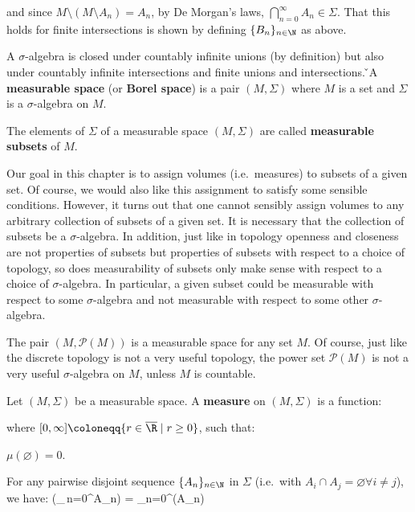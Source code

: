 and since $M\setminus(M\setminus A_n)=A_n$, by De Morgan's laws, $\bigcap_{n=0}^{\infty}{A_n} \in \Sigma$. That this
holds for finite intersections is shown by defining $\{B_n\}_{n\in \N}$ as above. \qedhere
\een
\eq

A $\sigma$-algebra is closed under countably infinite unions (by definition) but also under countably infinite
intersections and finite unions and intersections. \v

A \textbf{measurable space} (or \textbf{Borel space}) is a pair $(M,\Sigma)$ where $M$ is a set and $\Sigma$ is a
$\sigma$-algebra on $M$.
\ed

The elements of $\Sigma$ of a measurable space $(M,\Sigma)$ are called \textbf{measurable subsets} of $M$.
\ed

Our goal in this chapter is to assign volumes (i.e.\ measures) to subsets of a given set. Of course, we would also
like this assignment to satisfy some sensible conditions. However, it turns out that one cannot sensibly assign
volumes to any arbitrary collection of subsets of a given set. It is necessary that the collection of subsets be a
$\sigma$-algebra. In addition, just like in topology openness and closeness are not properties of subsets but
properties of subsets with respect to a choice of topology, so does measurability of subsets only make sense with
respect to a choice of $\sigma$-algebra. In particular, a given subset could be measurable with respect to some
$\sigma$-algebra and not measurable with respect to some other $\sigma$-algebra.

\be
The pair $(M,\mathscr{P}(M))$ is a measurable space for any set $M$. Of course, just like the discrete topology is
not a very useful topology, the power set $\mathscr{P}(M)$ is not a very useful $\sigma$-algebra on $M$, unless $M$
is countable.
\ee

\bd [Measure]
Let $(M,\Sigma)$ be a measurable space. A \textbf{measure} on $(M,\Sigma)$ is a function:
\bse
\mu\cl\Sigma\to[0,\infty]
\ese

where $[0,\infty] \coloneqq \{r\in\overline{\R}\mid r \geq 0\}$, such that:
\ben[label=(\roman*)]
\item $\mu(\varnothing)=0$.
\item For any pairwise disjoint sequence $\{A_n\}_{n\in \N}$ in $\Sigma$ (i.e.\ with $A_i\cap A_j = \varnothing \forall
i\neq j$), we have:
\bse
\mu\biggl(\bigcup_{\,n=0}^{\infty}A_n\biggr) = \sum_{n=0}^{\infty}\mu(A_n)
\ese

